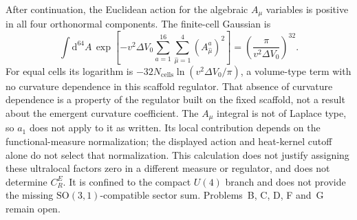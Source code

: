 After continuation, the Euclidean action for the algebraic \(A_\mu\)
variables is positive in all four orthonormal components. The
finite-cell Gaussian is
\[
  \int\mathrm{d}^{64}A\,
       \exp\!\left[-v^2\Delta V_0
          \sum_{a=1}^{16}\sum_{\hat\mu=1}^{4}
                 (A_{\hat\mu}^{a})^2\right]
  =\left(\frac{\pi}{v^2\Delta V_0}\right)^{32}.
\]
For equal cells its logarithm is
\(-32N_{\mathrm{cells}}\ln(v^2\Delta V_0/\pi)\), a
volume-type term with no curvature dependence in this scaffold
regulator. That absence of curvature dependence is a property of the
regulator built on the fixed scaffold, not a result about the
emergent curvature coefficient. The \(A_\mu\) integral is not of
Laplace type, so \(a_1\) does not apply to it as written. Its local
contribution depends on the functional-measure normalization; the
displayed action and heat-kernel cutoff alone do not select that
normalization. This calculation does not justify assigning these
ultralocal factors zero in a different measure or regulator, and does
not determine \(C_R^E\). It is confined to the compact \(U(4)\) branch
and does not provide the missing \(\mathrm{SO}(3,1)\)-compatible
sector sum. Problems~B, C, D, F and~G remain open.

